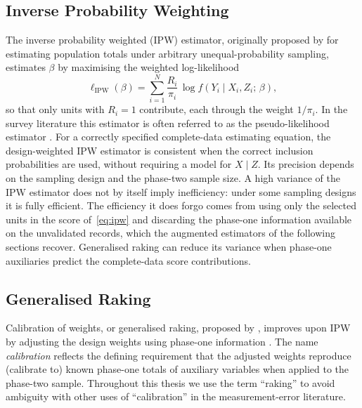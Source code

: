 \subsection{Inverse Probability Weighting}
\label{sec:ipw}

The inverse probability weighted (IPW) estimator, originally proposed by \citet{horvitz1952generalization} for estimating population totals under arbitrary unequal-probability sampling, estimates $\beta$ by maximising the weighted log-likelihood
\begin{equation}
    \ell_{\mathrm{IPW}}(\beta)
    = \sum_{i=1}^{N} \frac{R_i}{\pi_i}\,
    \log f(Y_i \mid X_i, Z_i;\, \beta),
    \label{eq:ipw}
\end{equation}
so that only units with $R_i = 1$ contribute, each through the weight $1/\pi_i$. In the survey literature this estimator is often referred to as the pseudo-likelihood estimator \citep{pfeffermann1993role}. For a correctly specified complete-data estimating equation, the design-weighted IPW estimator is consistent when the correct inclusion probabilities are used, without requiring a model for $X \mid Z$. Its precision depends on the sampling design and the phase-two sample size. A high variance of the IPW estimator does not by itself imply inefficiency: under some sampling designs it is fully efficient. The efficiency it does forgo comes from using only the selected units in the score of~\eqref{eq:ipw} and discarding the phase-one information available on the unvalidated records, which the augmented estimators of the following sections recover. Generalised raking can reduce its variance when phase-one auxiliaries predict the complete-data score contributions.

\subsection{Generalised Raking}
\label{sec:raking}

Calibration of weights, or generalised raking, proposed by \citet{deville1992calibration}, improves upon IPW by adjusting the design weights using phase-one information \citep{breslow2009using}. The name \emph{calibration} reflects the defining requirement that the adjusted weights reproduce (calibrate to) known phase-one totals of auxiliary variables when applied to the phase-two sample. Throughout this thesis we use the term ``raking'' to avoid ambiguity with other uses of ``calibration'' in the measurement-error literature.

